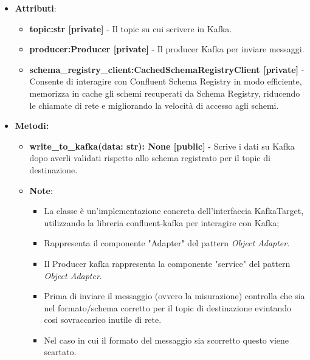 \begin{itemize}
\begin{itemize}
    \item\textbf{Attributi}:
        \begin{itemize}
        \item \textbf{topic:str [private]} - Il topic su cui scrivere in Kafka.
        \item \textbf{producer:Producer [private]} - Il producer Kafka per inviare messaggi.
        \item \textbf{schema\_registry\_client:CachedSchemaRegistryClient [private]} - Consente di interagire con Confluent Schema Registry in modo efficiente, memorizza in cache gli schemi recuperati da Schema Registry, riducendo le chiamate di rete e migliorando la velocità di accesso agli schemi.
    \end{itemize}
    \item \textbf{Metodi: }
    \begin{itemize}
        \item \textbf{write\_to\_kafka(data: str): None [public]} - Scrive i dati su Kafka dopo averli validati rispetto allo schema registrato per il topic di destinazione.
    \item\textbf{Note}:
        \begin{itemize}
            \item La classe è un'implementazione concreta dell'interfaccia KafkaTarget, utilizzando la libreria confluent-kafka per interagire con Kafka;
            \item Rappresenta il componente "Adapter" del pattern \textit{Object Adapter}.
            \item Il Producer kafka rappresenta la componente "service" del pattern \textit{Object Adapter}.
            \item Prima di inviare il messaggio  (ovvero la misurazione) controlla che sia nel formato/schema corretto per il topic di destinazione evintando cosi sovraccarico inutile di rete.
            \item Nel caso in cui il formato del messaggio sia scorretto questo viene scartato.
        \end{itemize}
    \end{itemize}
\end{itemize}


\end{itemize}
